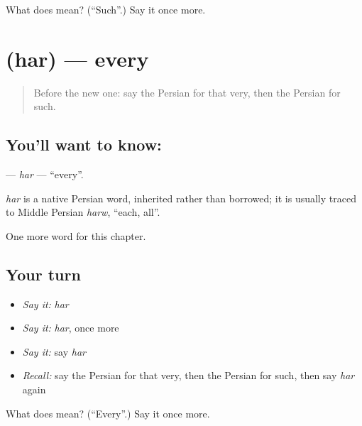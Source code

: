 \begin{tcolorbox}[breakable,colback=teal!4,colframe=teal!35!black,title={Before you move on}]
What does  mean? (\textquotedblleft{}Such\textquotedblright{}.) Say it once more.
\end{tcolorbox}
\section[\texorpdfstring{\fa{هر} (har)}{هر (har)}]{ (har) — every}

\label{lesson:FA-C83-har}



\begin{quote}
Before the new one: say the Persian for that very, then the Persian for such.
\end{quote}

\subsection*{You'll want to know: }
\textbf{} — \emph{har} — \textquotedblleft{}every\textquotedblright{}.

\begin{cousinweb}
\emph{har} is a native Persian word, inherited rather than borrowed; it is usually traced to Middle Persian \emph{harw}, \textquotedblleft{}each, all\textquotedblright{}.
\end{cousinweb}

\begin{grammarlens}[title={What you've built}]
One more word for this chapter.
\end{grammarlens}

\subsection*{Your turn}
\begin{itemize}
\raggedright
  \item \emph{Say it:} \emph{har}
  \item \emph{Say it:} \emph{har}, once more
  \item \emph{Say it:} say \emph{har}
  \item \emph{Recall:} say the Persian for that very, then the Persian for such, then say \emph{har} again
\end{itemize}

\begin{tcolorbox}[breakable,colback=teal!4,colframe=teal!35!black,title={Before you move on}]
What does  mean? (\textquotedblleft{}Every\textquotedblright{}.) Say it once more.
\end{tcolorbox}
